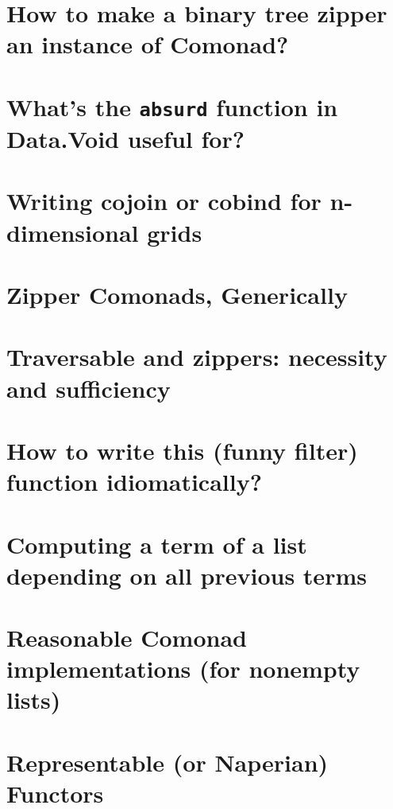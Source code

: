 \documentclass{book}%
\begin{document}
\section{How to make a binary tree zipper an instance of Comonad?}


\section{What's the {\texttt{absurd}} function in Data.Void useful for?}


\section{Writing cojoin or cobind for n-dimensional grids}


\section{Zipper Comonads, Generically}


\section{Traversable and zippers: necessity and sufficiency}


\section{How to write this (funny filter) function idiomatically?}


\section{Computing a term of a list depending on all previous terms}


\section{Reasonable Comonad implementations (for nonempty lists)}


\section{Representable (or Naperian) Functors}

\end{document}

